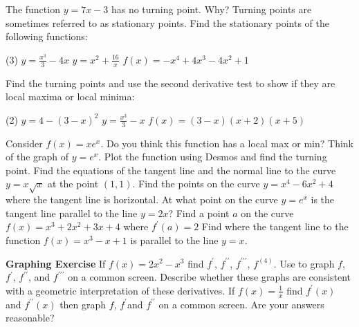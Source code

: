 \begin{Exercise}[title={Maximums, Minimums, and Tangents},label=exMinMax]
	\Question The function $y=7x-3$ has no turning point. Why? %
	\Question Turning points are sometimes referred to as stationary points. Find the stationary points of the following functions:
	\begin{tasks}(3)
		\task $y=\frac{x^3}{3}-4x$ %
		\task $y=x^2+\frac{16}{x}$ %
		\task $f(x)=-x^4+4x^3-4x^2+1$ %
	\end{tasks}
\Question Find the turning points and use the second derivative test to show if they are local maxima or local minima:
\begin{tasks}(2)
	\task $y=4-(3-x)^2$ %
	\task $y=\frac{x^3}{3}-x$ %
	\task $f(x)=(3-x)(x+2)(x+5)$ %
\end{tasks}
\Question Consider $f(x)=xe^x$. Do you think this function has a local max or min? Think of the graph of $y=e^x$. Plot the function using Desmos and find the turning point. %
\Question Find the equations of the	tangent line and the normal line to the curve $y =x \sqrt{x}$ at the point $(1 ,1)$. %
\Question Find the points on the curve $y =x^{4} -6 x^{2} +4$ where the tangent line is horizontal. %
\Question At what point on the curve $y =e^{x}$ is the tangent line parallel to the line $y =2 x$? %
\Question Find a point $a$ on the curve $f (x) =x^{3} +2 x^{2} +3 x +4$ where $f^{ \prime } (a) =2$ %
\Question Find where the tangent line to the function $f (x) =x^{3} -x +1$ is parallel to the line $y =x$.  %

{\hspace{-0.6cm}\textbf{Graphing Exercise}}
\Question If $f (x) =2 x^{2} -x^{3}$ find $f^{ \prime }$, $f^{ \prime  \prime }$, $f^{ \prime  \prime  \prime }$, $f^{(4)}$. Use \Desmos to graph $f$, $f^{ \prime }$, $f^{ \prime  \prime }$, and $f^{ \prime  \prime  \prime }$ on a common screen. Describe whether these graphs are consistent with a geometric interpretation of these derivatives. %
\Question If $f (x) =\frac{1}{x}$ find $f^{ \prime } (x)$ and $f^{ \prime  \prime } (x)$ then graph $f$, $f^{ \prime }$and $f^{ \prime  \prime }$ on a common screen. Are your answers reasonable? %

\end{Exercise}
